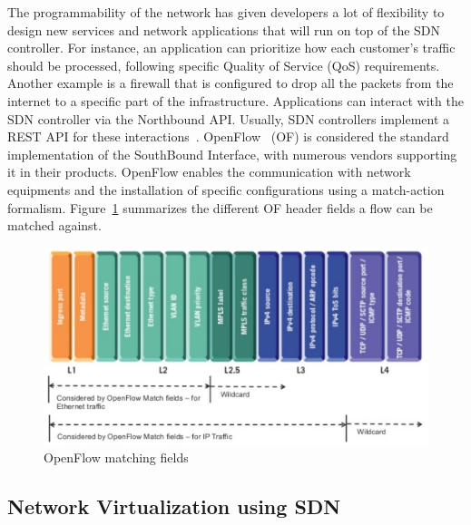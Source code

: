 The programmability of the network has given developers a lot of flexibility to design new services and network applications that will run on top of the SDN controller.
For instance, an application can prioritize how each customer's traffic should be processed, following specific Quality of Service (QoS) requirements.
Another example is a firewall that is configured to drop all the packets from the internet to a specific part of the infrastructure.
Applications can interact with the SDN controller via the Northbound API.
Usually, SDN controllers implement a REST API for these interactions~\cite{onos-Berde2014a,opendaylight,floodlight}.
OpenFlow~\cite{Openflow-McKeown2008} (OF) is considered the standard implementation of the SouthBound Interface, with numerous vendors supporting it in their products.
OpenFlow enables the communication with network equipments and the installation of specific configurations using a match-action formalism.
Figure~\ref{fig:matching-fields} summarizes the different OF header fields a flow can be matched against.

\begin{figure}[h]
    \centering
    \includegraphics[scale=0.7]{figures/openflow-matchfields.pdf}
    \caption{OpenFlow matching fields~\cite{openflow-matchfields}}
    \label{fig:matching-fields}
\end{figure}

\subsection{Network Virtualization using SDN}
\label{def:netvirt}

